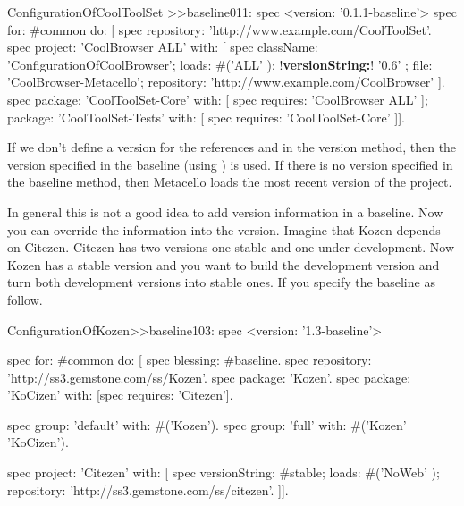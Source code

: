 \documentclass[a4paper,10pt,twoside]{book}
\begin{document}
\begin{code}{}
ConfigurationOfCoolToolSet >>baseline011: spec 
       <version: '0.1.1-baseline'>
       spec for: #common do: [
              spec repository: 'http://www.example.com/CoolToolSet'.
              spec project: 'CoolBrowser ALL' with: [
                            spec 
                                   className: 'ConfigurationOfCoolBrowser';
                                   loads: #('ALL' );
                                   !\textbf{versionString:}! '0.6' ;
                                   file: 'CoolBrowser-Metacello';
                                   repository: 'http://www.example.com/CoolBrowser' ].
              spec 
                     package: 'CoolToolSet-Core' with: [ spec requires: 'CoolBrowser ALL' ];
                     package: 'CoolToolSet-Tests' with: [ spec requires: 'CoolToolSet-Core' ]].
\end{code}       

If we don't define a version for the references   and  in the version method, then the version specified in the baseline (using ) is used.  If there is no version specified in the baseline method, then Metacello loads the most recent version of the project.


In general this is not a good idea to add version information in a baseline. Now you can override the information into the version. Imagine that Kozen depends on Citezen. Citezen has two versions one stable and one under development. Now Kozen has a stable version and you want to build the development 
version and turn both development versions into stable ones. If you specify the baseline as follow.

\begin{code}{}
ConfigurationOfKozen>>baseline103: spec
	<version: '1.3-baseline'>
 	
 	spec for: #common do: [
 		spec blessing: #baseline.
 		spec repository: 'http://ss3.gemstone.com/ss/Kozen'.
 		spec package: 'Kozen'.
 		spec package: 'KoCizen' with: [spec requires: 'Citezen'].
 				
 		spec group: 'default' with: #('Kozen').
 		spec group: 'full' with: #('Kozen' 'KoCizen').
 		
 	spec project: 'Citezen' with: [
 			spec 
 			   versionString: #stable;
 			   loads: #('NoWeb' );
 			   repository: 'http://ss3.gemstone.com/ss/citezen'.	]].
\end{code}
\end{document}
